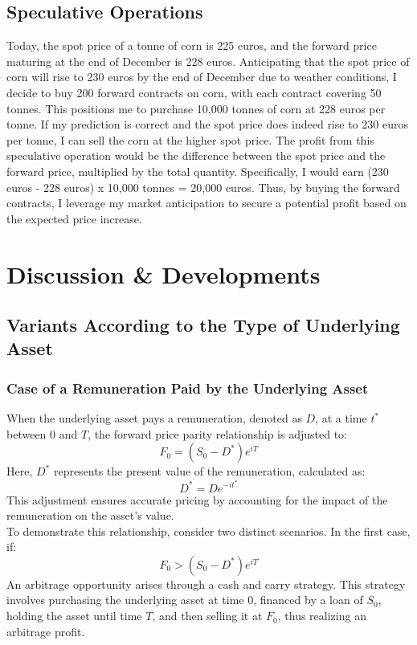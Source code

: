 \documentclass[a4paper,10pt]{article}
\begin{document}
    \subsection*{Speculative Operations}
       
        \noindent Today, the spot price of a tonne of corn is 225 euros, and the forward price maturing at the end of December is 228 euros. Anticipating that the spot price of corn will rise to 230 euros by the end of December due to weather conditions, I decide to buy 200 forward contracts on corn, with each contract covering 50 tonnes. This positions me to purchase 10,000 tonnes of corn at 228 euros per tonne. If my prediction is correct and the spot price does indeed rise to 230 euros per tonne, I can sell the corn at the higher spot price. The profit from this speculative operation would be the difference between the spot price and the forward price, multiplied by the total quantity. Specifically, I would earn (230 euros - 228 euros) x 10,000 tonnes = 20,000 euros. Thus, by buying the forward contracts, I leverage my market anticipation to secure a potential profit based on the expected price increase. \\
        

\section*{Discussion \& Developments}
    \subsection*{Variants According to the Type of Underlying Asset}
        \subsubsection*{Case of a Remuneration Paid by the Underlying Asset}
        
            \noindent When the underlying asset pays a remuneration, denoted as \(D\), at a time \(t^*\) between 0 and \(T\), the forward price parity relationship is adjusted to: \[F_0 = (S_0 - D^*) e^{iT}\] Here, \(D^*\) represents the present value of the remuneration, calculated as: \[D^* = D e^{-it^*}\] This adjustment ensures accurate pricing by accounting for the impact of the remuneration on the asset's value. \\

            \noindent To demonstrate this relationship, consider two distinct scenarios. In the first case, if:   \[F_0>(S_0 - D^*) e^{iT}\] An arbitrage opportunity arises through a cash and carry strategy. This strategy involves purchasing the underlying asset at time 0, financed by a loan of \(S_0\), holding the asset until time \(T\), and then selling it at \(F_0\), thus realizing an arbitrage profit.\\
            
\end{document}
